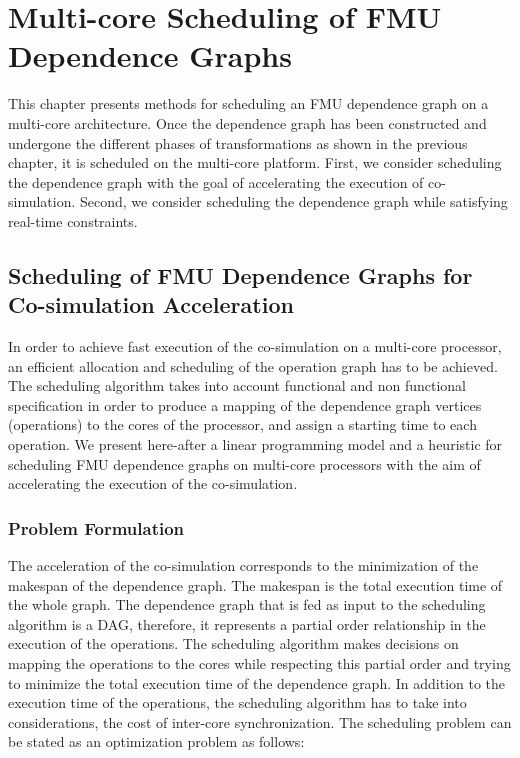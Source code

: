 \chapter{\label{ch:5-sched}Multi-core Scheduling of FMU Dependence Graphs} 

\minitoc

This chapter presents methods for scheduling an FMU dependence graph on a multi-core architecture. Once the dependence graph has been constructed and undergone the different phases of transformations as shown in the previous chapter, it is scheduled on the multi-core platform. First, we consider scheduling the dependence graph with the goal of accelerating the execution of co-simulation. Second, we consider scheduling the dependence graph while satisfying real-time constraints.  

\section{Scheduling of FMU Dependence Graphs for Co-simulation Acceleration}

In order to achieve fast execution of the co-simulation on a multi-core processor, an efficient allocation and scheduling of the operation graph has to be achieved. The scheduling algorithm takes into account functional and non functional specification in order to produce a mapping of the dependence graph vertices (operations) to the cores of the processor, and assign a starting time to each operation. We present here-after a linear programming model and a heuristic for scheduling FMU dependence graphs on multi-core processors with the aim of accelerating the execution of the co-simulation.

\subsection{\label{5:shed-prob}Problem Formulation}

The acceleration of the co-simulation corresponds to the minimization of the makespan of the dependence graph. The makespan is the total execution time of the whole graph. The dependence graph that is fed as input to the scheduling algorithm is a DAG, therefore, it represents a partial order relationship in the execution of the operations. The scheduling algorithm makes decisions on mapping the operations to the cores while respecting this partial order and trying to minimize the total execution time of the dependence graph. In addition to the execution time of the operations, the scheduling algorithm has to take into considerations, the cost of inter-core synchronization. The scheduling problem can be stated as an optimization problem as follows:

